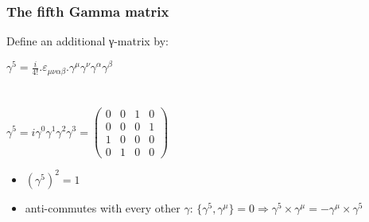 \label{The fifth Gamma matrix}
\begin{frame}\frametitle{The fifth Gamma matrix}

Define an additional γ-matrix by:\\

\begin{center}
 $\gamma ^{5}={\frac {i}{4!}} . \varepsilon _{\mu \nu \alpha \beta }.\gamma ^{\mu }\gamma ^{\nu }\gamma ^{\alpha }\gamma ^{\beta }$
\\
\\
\\ 
$ \gamma ^{5}=i \gamma^{0} \gamma^{1} \gamma^{2} \gamma^{3} ={\begin{pmatrix}0&0&1&0\\0&0&0&1\\1&0&0&0\\0&1&0&0\end{pmatrix}}$

 
\end{center}


\begin{itemize}
 \item  $(\gamma^5)^2 = 1$
\item anti-commutes with every other $\gamma$:
$\{\gamma^5,\gamma^\mu\}=0 \Longrightarrow \gamma^5\times \gamma^\mu = - \gamma^\mu \times \gamma^5 $
 
\end{itemize}




\end{frame}



\label{The fifth Gamma matrix}

